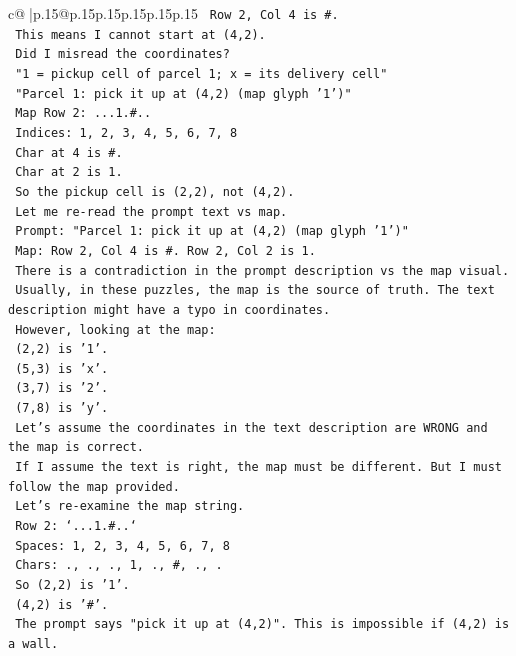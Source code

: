 \documentclass{article}
\begin{document}
{\begin{supertabular}{c@{$\;$}|p{.15\linewidth}@{}p{.15\linewidth}p{.15\linewidth}p{.15\linewidth}p{.15\linewidth}p{.15\linewidth}}
{{{\texttt{   Row 2, Col 4 is \#.} \\
\texttt{   This means I cannot start at (4,2).} \\
\texttt{   Did I misread the coordinates?} \\
\texttt{   "1 = pickup cell of parcel 1; x = its delivery cell"} \\
\texttt{   "Parcel 1: pick it up at (4,2) (map glyph '1')"} \\
\texttt{   Map Row 2: ...1.\#..} \\
\texttt{   Indices: 1, 2, 3, 4, 5, 6, 7, 8} \\
\texttt{   Char at 4 is \#.} \\
\texttt{   Char at 2 is 1.} \\
\texttt{   So the pickup cell is (2,2), not (4,2).} \\
\texttt{   Let me re{-}read the prompt text vs map.} \\
\texttt{   Prompt: "Parcel 1: pick it up at (4,2) (map glyph '1')"} \\
\texttt{   Map: Row 2, Col 4 is \#. Row 2, Col 2 is 1.} \\
\texttt{   There is a contradiction in the prompt description vs the map visual.} \\
\texttt{   Usually, in these puzzles, the map is the source of truth. The text description might have a typo in coordinates.} \\
\texttt{   However, looking at the map:} \\
\texttt{   (2,2) is '1'.} \\
\texttt{   (5,3) is 'x'.} \\
\texttt{   (3,7) is '2'.} \\
\texttt{   (7,8) is 'y'.} \\
\texttt{   Let's assume the coordinates in the text description are WRONG and the map is correct.} \\
\texttt{   If I assume the text is right, the map must be different. But I must follow the map provided.} \\
\texttt{   Let's re{-}examine the map string.} \\
\texttt{   Row 2: `...1.\#..`} \\
\texttt{   Spaces: 1, 2, 3, 4, 5, 6, 7, 8} \\
\texttt{   Chars: ., ., ., 1, ., \#, ., .} \\
\texttt{   So (2,2) is '1'.} \\
\texttt{   (4,2) is '\#'.} \\
\texttt{   The prompt says "pick it up at (4,2)". This is impossible if (4,2) is a wall.} \\
}}}
\end{supertabular}}
\end{document}
